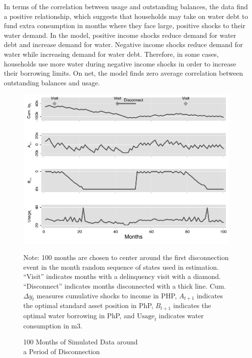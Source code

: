 \documentclass[12pt]{article}
\begin{document}
In terms of the correlation between usage and outstanding balances, the data find a positive relationship, which suggests that households may take on water debt to fund extra consumption in months where they face large, positive shocks to their water demand.  In the model, positive income shocks reduce demand for water debt and increase demand for water. Negative income shocks reduce demand for water while increasing demand for water debt.  Therefore, in some cases, households use more water during negative income shocks in order to increase their borrowing limits.  On net, the model finds zero average correlation between outstanding balances and usage.    

\begin{figure}[H]
\centering
\caption{100 Months of Simulated Data around \\ a Period of Disconnection}\label{figure:deaton}
\includegraphics[scale=1.1]{tables/new_deaton_graph.pdf} \\
{\scriptsize  
Note: 100 months are chosen to center around the first disconnection event in the month random sequence of states used in estimation.  ``Visit'' indicates months with a delinquency visit with a diamond.  ``Disconnect'' indicates months disconnected with a thick line.  Cum. $\Delta y_t$ measures cumulative shocks to income in PHP, $A_{t+1}$ indicates the optimal standard asset position in PhP, $B_{t+1}$ indicates the optimal water borrowing in PhP, and $\text{Usage}_t$ indicates water consumption in m3.
\par}
\end{figure}
\end{document}
